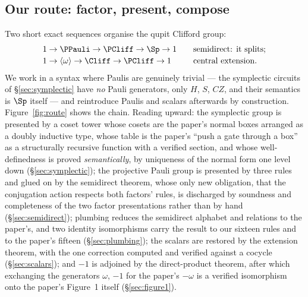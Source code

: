 \subsection{Our route: factor, present, compose}\label{sec:ourroute}

Two short exact sequences organise the qupit Clifford group:
\[
  \begin{array}{l@{\qquad}l}
  1 \to \PPauli \to \PCliff \to \Sp \to 1 & \text{semidirect: it splits;}\\[2pt]
  1 \to \langle\omega\rangle \to \Cliff \to \PCliff \to 1 & \text{central extension.}
  \end{array}
\]
We work in a syntax where Paulis are genuinely trivial --- the
symplectic circuits of \S\ref{sec:symplectic} have \emph{no} Pauli
generators, only $H$, $S$, $CZ$, and their semantics is $\Sp$ itself ---
and reintroduce Paulis and scalars afterwards by construction.
Figure~\ref{fig:route} shows the chain.  Reading upward: the symplectic
group is presented by a coset tower whose cosets are the paper's normal
boxes arranged as a doubly inductive type, whose table is the paper's
``push a gate through a box'' as a structurally recursive function with
a verified section, and whose well-definedness is proved
\emph{semantically}, by uniqueness of the normal form one level down
(\S\ref{sec:symplectic}); the projective Pauli group is presented by
three rules and glued on by the semidirect theorem, whose only new
obligation, that the conjugation action respects both factors' rules, is
discharged by soundness and completeness of the two factor presentations
rather than by hand (\S\ref{sec:semidirect}); plumbing reduces the
semidirect alphabet and relations to the paper's, and two identity
isomorphisms carry the result to our sixteen rules and to the paper's
fifteen (\S\ref{sec:plumbing}); the scalars are restored by the
extension theorem, with the one correction computed and verified against
a cocycle (\S\ref{sec:scalars}); and $-1$ is adjoined by the
direct-product theorem, after which exchanging the generators $\omega$,
$-1$ for the paper's $-\omega$ is a verified isomorphism onto the
paper's Figure~1 itself (\S\ref{sec:figure1}).

